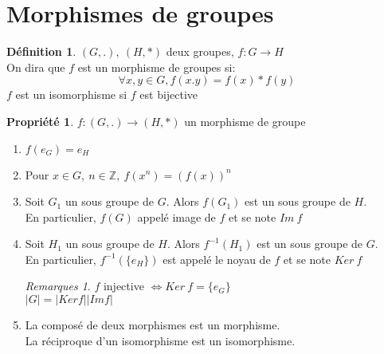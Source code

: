 \documentclass[fleqn]{article}
\theoremstyle{definition} \newtheorem*{defi}{D\'efinition}
\theoremstyle{definition} \newtheorem*{theo}{Th\'eor\`eme}
\theoremstyle{definition} \newtheorem*{coro}{Corollaire}
\theoremstyle{remark} \newtheorem*{rqs}{Remarques}
\theoremstyle{definition} \newtheorem*{prop}{Propri\'et\'e}
\begin{document}
\section{Morphismes de groupes}
\begin{defi}
$(G,.),\ (H, *)$ deux groupes, $f: G \rightarrow H$ \\
On dira que $f$ est un morphisme de groupes si:
\[\forall x,y \in G, f(x.y) = f(x) * f(y)\]
$f$ est un isomorphisme si $f$ est bijective
\end{defi}

\begin{prop} $f: (G,.) \rightarrow (H,*)$ un morphisme de groupe
	\begin{enumerate}
		\item $f(e_G) = e_H$
		\item Pour $x \in G,\ n \in \mathbb{Z},\ f(x^n) = (f(x))^n$
		\item Soit $G_1$ un sous groupe de $G$. Alors $f(G_1)$ est un sous groupe de $H$.\\ En particulier, $f(G)$ appel\'e image de $f$
			et se note $Im\ f$
		\item Soit $H_1$ un sous groupe de $H$. Alors $f^{-1}(H_1)$ est un sous groupe de $G$. \\ En particulier, $f^{-1}(\{e_H\})$ est
			appel\'e le noyau de $f$ et se note $Ker\ f$
		\begin{rqs} $f$ injective $\Leftrightarrow Ker\ f = \{e_G\}$ \\ $|G| = |Ker f| |Im f|$ \end{rqs}
		\item La compos\'e de deux morphismes est un morphisme.\\
			La r\'eciproque d'un isomorphisme est un isomorphisme.
	\end{enumerate}
\end{prop}
\end{document}

